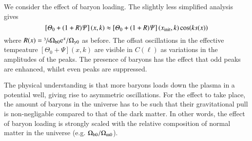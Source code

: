     
    
    




    
    We consider the effect of baryon loading. The slightly less simplified analysis gives
    \begin{equation}
        \left[\varTheta_0 +(1+R) \varPsi\right](x, k) \approx \left[\varTheta_0 + (1+R)\varPsi\right](x_\mathrm{init}, k)\cos(ks(x)) 
    \end{equation}
    where $R(x) = \sfrac{3}{4}\Omega\ped{b0} \eu[x]/\Omega\ped{\gamma 0}$ as before. The offsat oscillations in the effective tempeature $\left[\Theta_0 +\Psi\right](x, k)$ are visible in $C(\ell)$ as variations in the amplitudes of the peaks. The presence of baryons has the effect that odd peaks are enhanced, whilst even peaks are suppressed. 

    The physical understanding is that more baryons loads down the plasma in a potential well, giving rise to asymmetric oscillations. For the effect to take place, the amount of baryons in the universe has to be such that their gravitational pull is non-negligable compared to that of the dark matter. In other words, the effect of baryon loading is strongly scaled with the relative composition of normal matter in the universe (e.g. $\Omega_\mathrm{b0}/\Omega_{\mathrm{m}0}$).
    
